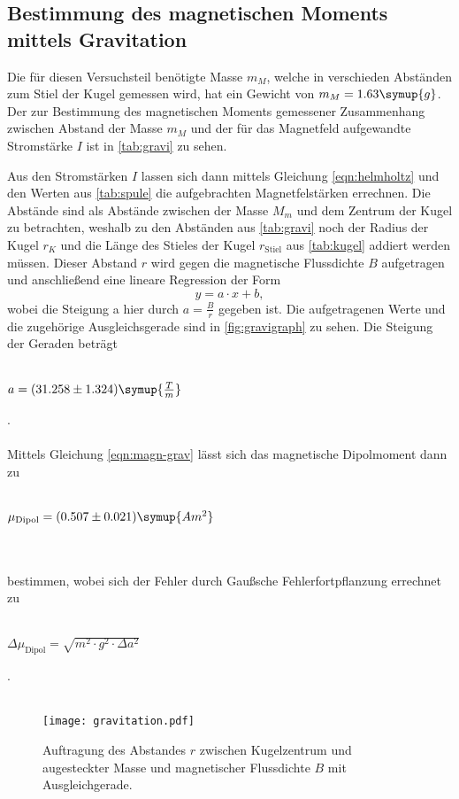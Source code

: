 \subsection{Bestimmung des magnetischen Moments mittels Gravitation}
  Die für diesen Versuchsteil benötigte Masse $m_M$, welche in verschieden Abständen zum Stiel der Kugel gemessen wird, hat ein Gewicht von
  $m_M = 1.63 \symup{g}$. 
  Der zur Bestimmung des magnetischen Moments gemessener Zusammenhang zwischen Abstand der Masse $m_M$ und der für das Magnetfeld
  aufgewandte Stromstärke $I$ ist in \autoref{tab:gravi} zu sehen.
  
  Aus den Stromstärken $I$ lassen sich dann mittels Gleichung \eqref{eqn:helmholtz} und den Werten aus \autoref{tab:spule}
   die aufgebrachten Magnetfelstärken errechnen. Die Abstände sind als 
  Abstände zwischen der Masse $M_m$ und dem Zentrum der Kugel zu betrachten, weshalb zu den Abständen aus \autoref{tab:gravi} 
  noch der Radius der Kugel $r_K$ und die Länge des Stieles der Kugel $r_\text{Stiel}$ aus \autoref{tab:kugel} addiert werden müssen.
  Dieser Abstand $r$ wird gegen die magnetische Flussdichte $B$ aufgetragen und anschließend eine lineare Regression der Form 
  \begin{equation}
  \label{eqn:Gerade}
    y = a \cdot x + b,
  \end{equation}
  wobei die Steigung a hier durch $a = \frac{B}{r}$ gegeben ist. Die aufgetragenen Werte und die zugehörige Ausgleichsgerade
  sind in \autoref{fig:gravigraph} zu sehen.
  Die Steigung der Geraden beträgt
  \\ \\
  \centerline{$a = (31.258 \pm 1.324) \symup{\frac{T}{m}}$}.
  \\ \\ 
  Mittels Gleichung \eqref{eqn:magn-grav} lässt sich das magnetische Dipolmoment dann zu
  \\ \\ 
  \centerline{$\mu_\text{Dipol} = (0.507 \pm 0.021) \symup{A m^2}$}
  \\ \\
  bestimmen, wobei sich der Fehler durch Gaußsche Fehlerfortpflanzung errechnet zu 
  \\ \\
  \centerline{$\Delta \mu_\text{Dipol} = \sqrt{m^2 \cdot g^2 \cdot \Delta a^2}$}.
  \\ \\


\begin{figure}
  \centering
  \texttt{[image: gravitation.pdf]}
  \caption{Auftragung des Abstandes $r$ zwischen Kugelzentrum und augesteckter Masse und magnetischer Flussdichte $B$ mit Ausgleichgerade.}
  \label{fig:gravigraph}
\end{figure}


